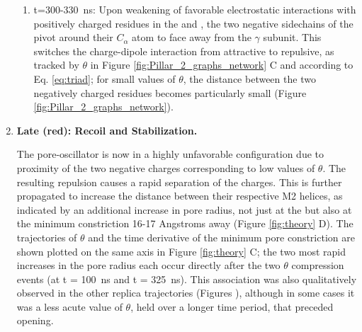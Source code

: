 \documentclass[9pt,twocolumn,twoside,lineno]{pnas-new}
\begin{document}
\begin{enumerate}
\begin{enumerate}
\item  t=300-330~ns: Upon weakening of favorable electrostatic interactions with positively charged residues in the \triad and \fiveringnos,  the two negative sidechains of the \triad pivot around their $C_{\alpha}$ atom to face away from the $\gamma$ subunit.  This switches the \triad charge-dipole interaction from attractive to repulsive, as tracked by $\theta$ in Figure \ref{fig:Pillar_2_graphs_network} C and according to Eq.  \ref{eq:triad}; for small values of $\theta$, the distance between the two negatively charged residues becomes particularly small (Figure  \ref{fig:Pillar_2_graphs_network}). %
\end{enumerate}

\item {\bf Late (red): Recoil and Stabilization.} 

The pore-oscillator is now in a highly unfavorable configuration due to proximity of the two negative charges corresponding to low values of $\theta$.  %
The resulting repulsion causes a rapid separation of the charges. This is further propagated to increase the distance between their respective M2 helices, as indicated by an additional increase in pore radius, not just %
at the \triad but also at the minimum constriction 16-17 Angstroms away  (Figure \ref{fig:theory} D). 
The trajectories of $\theta$ and the time derivative of the minimum pore constriction are shown plotted on the same axis in Figure \ref{fig:theory} C; the two most rapid increases in the pore radius each occur directly after the two $\theta$ compression events (at t = 100~ns and t = 325~ns).  This association was also qualitatively observed in the other replica trajectories (Figures \sFigReplicas), although in some cases it was a less acute value of $\theta$, held over a longer time period, that preceded opening.  


\end{enumerate}
\end{document}
